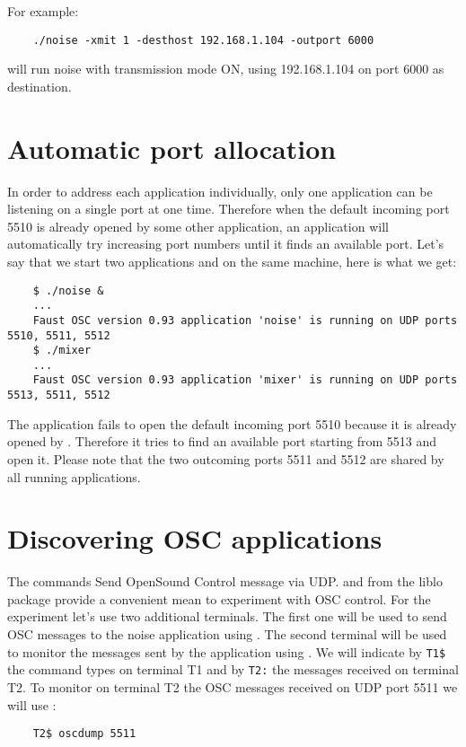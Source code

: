 For example:
\begin{lstlisting}
	./noise -xmit 1 -desthost 192.168.1.104 -outport 6000
\end{lstlisting}
will run noise with transmission mode ON, using 192.168.1.104 on port 6000 as destination.

\section{Automatic port allocation}
In order to address each application individually, only one application can be listening on a single port at one time. Therefore when the default incoming port 5510 is already opened by some other application, an application will automatically try increasing port numbers until it finds an available port. Let's say that we start two applications  and  on the same machine, here is what we get:
\begin{lstlisting}
	$ ./noise &
	...
	Faust OSC version 0.93 application 'noise' is running on UDP ports 5510, 5511, 5512
	$ ./mixer
	...
	Faust OSC version 0.93 application 'mixer' is running on UDP ports 5513, 5511, 5512
\end{lstlisting}
The  application fails to open the default incoming port 5510 because it is already opened by . Therefore it tries to find an available port starting from 5513 and open it. Please note that the two outcoming ports 5511 and 5512 are shared by all running applications.

\section{Discovering OSC applications}

The commands 
Send OpenSound Control message via UDP. and  from the liblo package provide a convenient mean to experiment with OSC control. For the experiment let's use two additional terminals. The first one will be used to send OSC messages to the noise application using . The second terminal will be used to monitor the messages sent by the application using . We will indicate by \lstinline'T1$' the command types on terminal T1 and by \lstinline'T2:' the messages received on terminal T2. To monitor on terminal T2 the OSC messages received on UDP port 5511 we will use :
\begin{lstlisting}
	T2$ oscdump 5511
\end{lstlisting}


